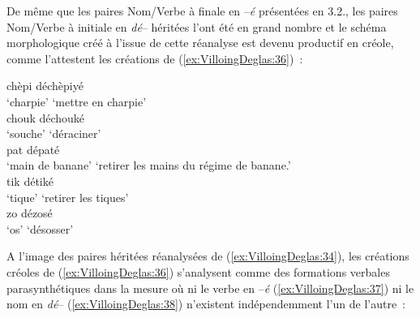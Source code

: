 \documentclass[output=paper]{langsci/langscibook}
\begin{document}
De même que les paires Nom/Verbe à finale en --\emph{é} présentées en
3.2., les paires Nom/Verbe à initiale en \emph{dé}-- héritées l'ont été
en grand nombre et le schéma morphologique créé à l'issue de cette
réanalyse est devenu productif en créole, comme l'attestent les
créations de (\ref{ex:VilloingDeglas:36})~:

\ea \label{ex:VilloingDeglas:36}
      \ea \gll chèpi \textrightarrow{} déchèpiyé\\
        {`charpie'} {} {`mettre en charpie'}\\
      \ex \gll  chouk \textrightarrow{} déchouké\\
        {`souche'} {} {`déraciner'}\\
      \ex \gll  pat \textrightarrow{} dépaté\\
        {`main de banane'} {} {`retirer les mains du régime de banane.'}\\
      \ex \gll  tik \textrightarrow{} détiké\\
        {`tique'} {} {`retirer les tiques'}\\
      \ex \gll  zo \textrightarrow{} dézosé\\
        {`os'} {} {`désosser'}\\
\z\z

A l'image des paires héritées réanalysées de (\ref{ex:VilloingDeglas:34}), les créations créoles
de (\ref{ex:VilloingDeglas:36}) s'analysent comme des formations verbales parasynthétiques dans
la mesure où ni le verbe en --\emph{é} (\ref{ex:VilloingDeglas:37}) ni le nom en \emph{dé}-- (\ref{ex:VilloingDeglas:38})
n'existent indépendemment l'un de l'autre~:
\end{document}
